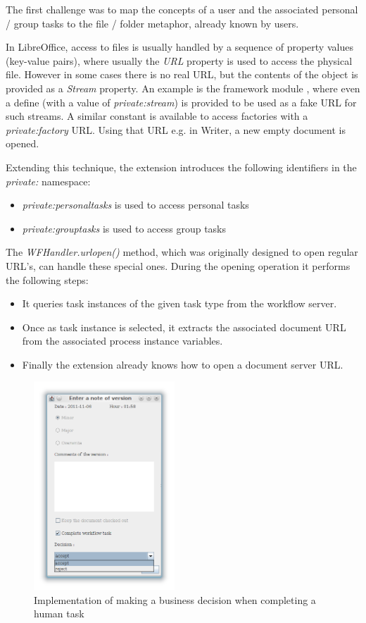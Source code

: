 The first challenge was to map the concepts of a user and the associated
personal / group tasks to the file / folder metaphor, already known by users.

In LibreOffice, access to files is usually handled by a sequence of property
values (key-value pairs), where usually the \emph{URL} property is used to
access the physical file. However in some cases there is no real URL, but the
contents of the object is provided as a \emph{Stream} property.  An example is
the framework module \cite{lo-framework-module}, where even a define (with a
value of \emph{private:stream}) is provided to be used as a fake URL for such
streams.  A similar constant is available to access factories with a
\emph{private:factory} URL. Using that URL e.g. in Writer, a new empty document
is opened.

Extending this technique, the extension introduces the following identifiers in
the \emph{private:} namespace:

\begin{itemize}
\item \emph{private:personaltasks} is used to access personal tasks
\item \emph{private:grouptasks} is used to access group tasks
\end{itemize}

The \emph{WFHandler.urlopen()} method, which was originally designed to open
regular URL's, can handle these special ones. During the opening operation it performs the following steps:

\begin{itemize}
\item It queries task instances of the given task type from the workflow server.
\item Once as task instance is selected, it extracts the associated document URL from the associated process instance variables.
\item Finally the extension already knows how to open a document server URL.
\end{itemize}

\begin{figure}[H]
\centering
\includegraphics[width=200px,keepaspectratio]{implementation-decision.png}
\caption{Implementation of making a business decision when completing a human task}
\label{fig:implementation-decision}
\end{figure}

